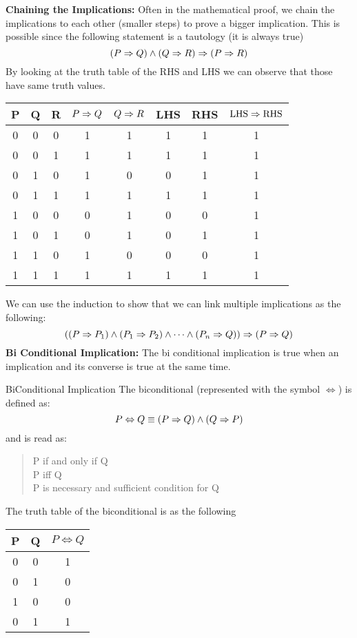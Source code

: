 \textbf{Chaining the Implications:} Often in the mathematical proof, we chain the implications to each other (smaller steps) to prove a bigger implication. This is possible since the following statement is a tautology (it is always true)
\[  (P \Rightarrow Q) \wedge (Q \Rightarrow R) \Rightarrow (P \Rightarrow R)  \]
By looking at the truth table of the RHS and LHS we can observe that those have same truth values.
\begin{center}
	\begin{tabular}{|c|c|c|c|c|c|c|c|}
		\hline
		P & Q & R & $ P \Rightarrow Q $ & $ Q \Rightarrow R $ & LHS & RHS & $ \text{LHS} \Rightarrow \text{RHS} $ \\
		\hline
		0 & 0 & 0 & 1 & 1 & 1 & 1 & 1 \\
		\hline
		0 & 0 & 1 & 1 & 1 & 1 & 1 & 1 \\
		\hline
		0 & 1 & 0 & 1 & 0 & 0 & 1 & 1 \\
		\hline
		0 & 1 & 1 & 1 & 1 & 1 & 1 & 1 \\
		\hline
		1 & 0 & 0 & 0 & 1 & 0 & 0 & 1 \\
		\hline
		1 & 0 & 1 & 0 & 1 & 0 & 1 & 1 \\
		\hline
		1 & 1 & 0 & 1 & 0 & 0 & 0 & 1 \\
		\hline
		1 & 1 & 1 & 1 & 1 & 1 & 1 & 1 \\
		\hline
	\end{tabular}
\end{center} 
We can use the induction to show that we can link multiple implications as the following:
\[ ((P \Rightarrow P_1) \wedge (P_1 \Rightarrow P_2) \wedge \cdots \wedge (P_n \Rightarrow Q)) \Rightarrow (P \Rightarrow Q) \]
\newpage
\textbf{Bi Conditional Implication:} The bi conditional implication is true when an implication and its converse is true at the same time.

\begin{defbox}{BiConditional Implication}
	The biconditional (represented with the symbol $\Leftrightarrow$) is defined as:
	\[ P \Leftrightarrow Q \equiv (P \Rightarrow Q) \wedge (Q \Rightarrow P) \]
	and is read as:
	\begin{quote}
		P if and only if Q \\
		P iff Q \\
		P is necessary and sufficient condition for Q
	\end{quote}
	The truth table of the biconditional is as the following
	\begin{center}
	\begin{tabular}{|c|c|c|}
		\hline
		P & Q & $ P \Leftrightarrow Q $ \\
		\hline
		0 & 0 & 1 \\
		\hline
		0 & 1 & 0 \\
		\hline
		1 & 0 & 0 \\
		\hline
		0 & 1 & 1 \\
		\hline
	\end{tabular}
	\end{center}
\end{defbox}


